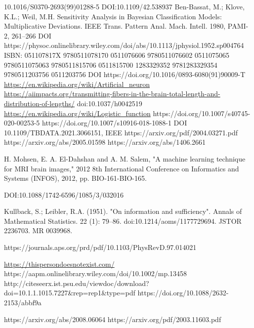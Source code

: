 \begin{thebibliography}{99}

 10.1016/S0370-2693(99)01288-5
 DOI:10.1109/42.538937
 Ben-Bassat, M.; Klove, K.L.; Weil, M.H. Sensitivity Analysis in Bayesian Classification Models: Multiplicative Deviations. IEEE Trans. Pattern Anal. Mach. Intell. 1980, PAMI-2, 261–266
  DOI https://physoc.onlinelibrary.wiley.com/doi/abs/10.1113/jphysiol.1952.sp004764
  ISBN:	051107817X 9780511078170 0511076606 9780511076602 0511075065 9780511075063 9780511815706 0511815700 1283329352 9781283329354 9780511203756 0511203756
 DOI https://doi.org/10.1016/0893-6080(91)90009-T
 \url{https://en.wikipedia.org/wiki/Artificial_neuron}
 \url{https://aiimpacts.org/transmitting-fibers-in-the-brain-total-length-and-distribution-of-lengths/}
 doi:10.1037/h0042519
 \url{https://en.wikipedia.org/wiki/Logistic_function}
 https://doi.org/10.1007/s40745-020-00253-5
https://doi.org/10.1007/s10916-018-1088-1
  DOI 10.1109/TBDATA.2021.3066151, IEEE
 https://arxiv.org/pdf/2004.03271.pdf
 https://arxiv.org/abs/2005.01598
 https://arxiv.org/abs/1406.2661

 H. Mohsen, E. A. El-Dahshan and A. M. Salem, "A machine learning technique for MRI brain images," 2012 8th International Conference on Informatics and Systems (INFOS), 2012, pp. BIO-161-BIO-165.


 DOI:10.1088/1742-6596/1085/3/032016

  Kullback, S.; Leibler, R.A. (1951). "On information and sufficiency". Annals of Mathematical Statistics. 22 (1): 79–86. doi:10.1214/aoms/1177729694. JSTOR 2236703. MR 0039968.

 https://journals.aps.org/prd/pdf/10.1103/PhysRevD.97.014021

 \url{https://thispersondoesnotexist.com/}
 https://aapm.onlinelibrary.wiley.com/doi/10.1002/mp.13458
 http://citeseerx.ist.psu.edu/viewdoc/download?doi=10.1.1.1015.7227&rep=rep1&type=pdf
 https://doi.org/10.1088/2632-2153/abbf9a


 https://arxiv.org/abs/2008.06064
 https://arxiv.org/pdf/2003.11603.pdf



\end{thebibliography}
